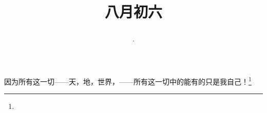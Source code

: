\title{\date[d=8,m=9,y=2024][year:cn-y,年,month:cn,day:cn,日,·,weekday]·八月初六 }
因为所有这一切——天，地，世界，——所有这一切中的能有的只是我自己！\footnote{ }


